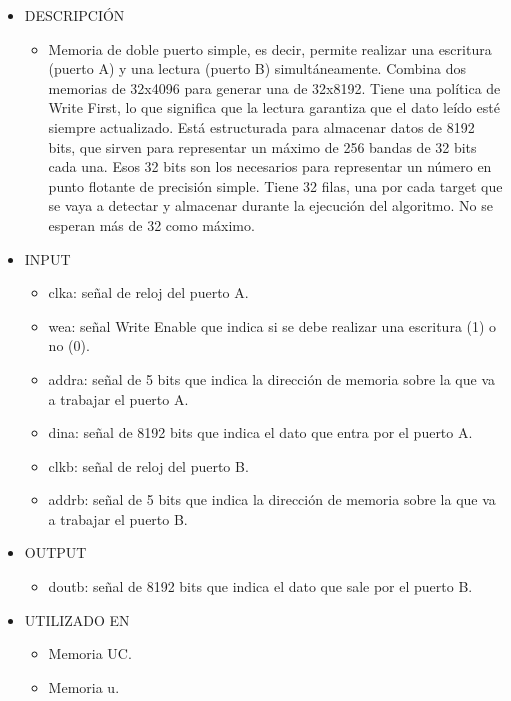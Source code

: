 \begin{itemize}
    \item DESCRIPCIÓN
        \begin{itemize}
            \item Memoria de doble puerto simple, es decir, permite realizar una escritura (puerto A) y una lectura (puerto B) simultáneamente. Combina dos memorias de 32x4096 para generar una de 32x8192. Tiene una política de Write First, lo que significa que la lectura garantiza que el dato leído esté siempre actualizado. Está estructurada para almacenar datos de 8192 bits, que sirven para representar un máximo de 256 bandas de 32 bits cada una. Esos 32 bits son los necesarios para representar un número en punto flotante de precisión simple. Tiene 32 filas, una por cada target que se vaya a detectar y almacenar durante la ejecución del algoritmo. No se esperan más de 32 como máximo.
        \end{itemize}
    \item INPUT
        \begin{itemize}
            \item clka: señal de reloj del puerto A.
            \item wea: señal Write Enable que indica si se debe realizar una escritura (1) o no (0).
            \item addra: señal de 5 bits que indica la dirección de memoria sobre la que va a trabajar el puerto A.
            \item dina: señal de 8192 bits que indica el dato que entra por el puerto A.
            \item clkb: señal de reloj del puerto B.
            \item addrb: señal de 5 bits que indica la dirección de memoria sobre la que va a trabajar el puerto B.
        \end{itemize}
    \item OUTPUT
        \begin{itemize}
            \item doutb: señal de 8192 bits que indica el dato que sale por el puerto B.
        \end{itemize}
    \item UTILIZADO EN
        \begin{itemize}
            \item Memoria UC.
            \item Memoria u.
        \end{itemize}
\end{itemize}

